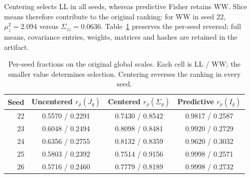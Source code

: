 Centering selects LL in all seeds, whereas predictive Fisher retains WW. Slice means therefore contribute to the original ranking: for WW in seed 22, $\mu_z^2=2.094$ versus $\Sigma_{zz}=0.0636$. Table~\ref{tab:d-matrix-per-seed} preserves the per-seed reversal; full means, covariance entries, weights, matrices and hashes are retained in the artifact.

\begin{table}[htbp]
\centering\small
\caption{Per-seed fractions on the original global scales. Each cell is LL / WW; the smaller value determines selection. Centering reverses the ranking in every seed.}
\label{tab:d-matrix-per-seed}
\begin{tabular}{@{}rccc@{}}
\toprule
Seed & Uncentered $r_\rho(J_g)$ & Centered $r_\rho(\Sigma_g)$ & Predictive $r_\rho(I_g)$ \\
\midrule
22 & 0.5570 / 0.2291 & 0.7430 / 0.8542 & 0.9817 / 0.2587 \\
23 & 0.6048 / 0.2494 & 0.8098 / 0.8481 & 0.9920 / 0.2729 \\
24 & 0.6356 / 0.2755 & 0.8132 / 0.8359 & 0.9620 / 0.3032 \\
25 & 0.5803 / 0.2392 & 0.7514 / 0.9156 & 0.9998 / 0.2571 \\
26 & 0.5716 / 0.2460 & 0.7779 / 0.8189 & 0.9998 / 0.2732 \\
\bottomrule
\end{tabular}
\end{table}
